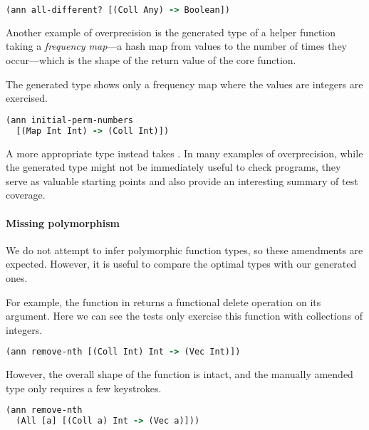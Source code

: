 \begin{lstlisting}[language=Clojure]
(ann all-different? [(Coll Any) -> Boolean])
\end{lstlisting}

Another example of overprecision is the generated type
of  a helper function
taking a \emph{frequency map}---a hash map from values
to the number of times they occur---which is the shape
of the return value of the core 
function.

The generated type shows only a frequency map where
the values are integers are exercised.
%
\begin{lstlisting}[language=Clojure]
(ann initial-perm-numbers
  [(Map Int Int) -> (Coll Int)])
\end{lstlisting}
%
A more appropriate type instead takes .
%
%
In many examples of overprecision, while the generated
type might not be immediately useful to check programs,
they serve as valuable starting points and also provide
an interesting summary of test coverage.

\paragraph{Missing polymorphism}

We do not attempt to infer polymorphic function types, 
so these amendments are expected. However, it is useful
to compare the optimal types with our generated ones.

For example, the  function in 
returns a functional delete operation on its argument.
Here we can see the tests only exercise this function with
collections of integers.

\begin{lstlisting}[language=Clojure]
(ann remove-nth [(Coll Int) Int -> (Vec Int)])
\end{lstlisting}

However, the overall shape of the function is intact,
and the manually amended type only requires a few 
keystrokes.

\begin{lstlisting}[language=Clojure]
(ann remove-nth
  (All [a] [(Coll a) Int -> (Vec a)]))
\end{lstlisting}

